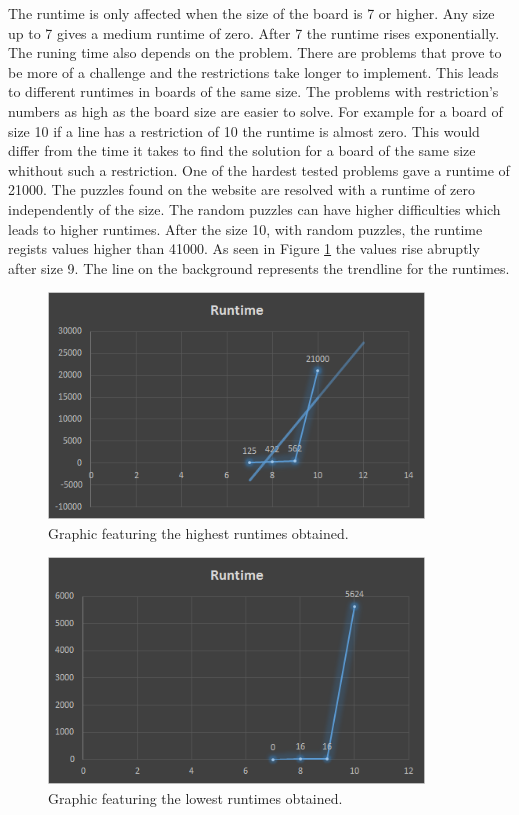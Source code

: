 \documentclass[runningheads,a4paper]{llncs}
\begin{document}
	The runtime is only affected when the size of the board is 7 or higher. Any size up to 7 gives a medium runtime of zero. After 7 the runtime rises exponentially. The runing time also depends on the problem. There are problems that prove to be more of a challenge and the restrictions take longer to implement. This leads to different runtimes in boards of the same size. The problems with restriction's numbers as high as the board size are easier to solve. For example for a board of size 10 if a line has a restriction of 10 the runtime is almost zero. This would differ from the time it takes to find the solution for a board of the same size whithout such a restriction. One of the hardest tested problems gave a runtime of 21000. The puzzles found on the website are resolved with a runtime of zero independently of the size. The random puzzles can have higher difficulties which leads to higher runtimes. After the size 10, with random puzzles, the runtime regists values higher than 41000. As seen in Figure \ref{runtimeHigh} the values rise abruptly after size 9. The line on the background represents the trendline for the runtimes. 

	\begin{figure}[h!]
	\centering
	\includegraphics[height=6.0cm]{runtimeHigh.png}
	\caption{Graphic featuring the highest runtimes obtained.}
	\label{runtimeHigh}
	\end{figure}


	\begin{figure}[h!]
	\centering
	\includegraphics[height=6.0cm]{runtimeBest.png}
	\caption{Graphic featuring the lowest runtimes obtained.}
	\label{runtimeBest}
	\end{figure}
\end{document}
